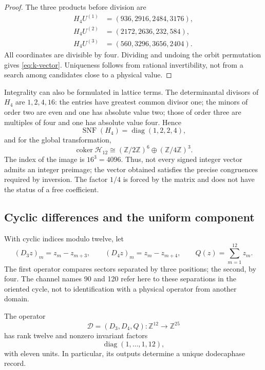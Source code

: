 \begin{proof}
The three products before division are
\begin{align*}
 H_4U^{(1)}&=(936,2916,2484,3176),\\
 H_4U^{(2)}&=(2172,2636,232,584),\\
 H_4U^{(3)}&=(560,3296,3656,2404).
\end{align*}
All coordinates are divisible by four. Dividing and undoing the
orbit permutation gives \eqref{eq:k-vector}. Uniqueness follows from
rational invertibility, not from a search among candidates close to
a physical value.
\end{proof}

Integrality can also be formulated in lattice terms. The
determinantal divisors of \(H_4\) are \(1,2,4,16\): the entries
have greatest common divisor one; the minors of order two are even and
one has absolute value two; those of order three are multiples of four and
one has absolute value four. Hence
\[
 \operatorname{SNF}(H_4)=\operatorname{diag}(1,2,2,4),
\]
and for the global transformation,
\[
 \operatorname{coker}\mathcal H_{12}
 \cong(\mathbb Z/2\mathbb Z)^6\oplus(\mathbb Z/4\mathbb Z)^3.
\]
The index of the image is \(16^3=4096\). Thus, not every signed
integer vector admits an integer preimage; the vector obtained satisfies the
precise congruences required by inversion. The factor \(1/4\) is
forced by the matrix and does not have the status of a free coefficient.

\subsection{Cyclic differences and the uniform component}
\label{subsec:k-transversal}

With cyclic indices modulo twelve, let
\[
 (D_3z)_m=z_m-z_{m+3},\qquad(D_4z)_m=z_m-z_{m+4},
 \qquad Q(z)=\sum_{m=1}^{12}z_m.
\]
The first operator compares sectors separated by three positions; the
second, by four. The channel names 90 and 120 refer here to
these separations in the oriented cycle, not to identification with a
physical operator from another domain.

\begin{proposition}
\label{prop:k-transversal}
The operator
\[
 \mathcal D=(D_3,D_4,Q):\mathbb Z^{12}\longrightarrow\mathbb Z^{25}
\]
has rank twelve and nonzero invariant factors
\[
 \operatorname{diag}(1,\ldots,1,12),
\]
with eleven units. In particular, its outputs determine a unique dodecaphase record.
\end{proposition}

